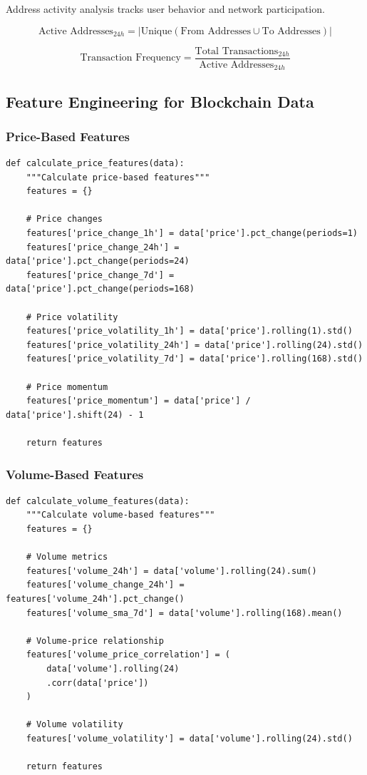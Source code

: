 \documentclass[12pt,a4paper]{article}
\begin{document}
Address activity analysis tracks user behavior and network participation.

\begin{equation}
\text{Active Addresses}_{24h} = |\text{Unique}(\text{From Addresses} \cup \text{To Addresses})|
\end{equation}

\begin{equation}
\text{Transaction Frequency} = \frac{\text{Total Transactions}_{24h}}{\text{Active Addresses}_{24h}}
\end{equation}

\subsection{Feature Engineering for Blockchain Data}

\subsubsection{Price-Based Features}

\begin{lstlisting}
def calculate_price_features(data):
    """Calculate price-based features"""
    features = {}
    
    # Price changes
    features['price_change_1h'] = data['price'].pct_change(periods=1)
    features['price_change_24h'] = data['price'].pct_change(periods=24)
    features['price_change_7d'] = data['price'].pct_change(periods=168)
    
    # Price volatility
    features['price_volatility_1h'] = data['price'].rolling(1).std()
    features['price_volatility_24h'] = data['price'].rolling(24).std()
    features['price_volatility_7d'] = data['price'].rolling(168).std()
    
    # Price momentum
    features['price_momentum'] = data['price'] / data['price'].shift(24) - 1
    
    return features
\end{lstlisting}

\subsubsection{Volume-Based Features}

\begin{lstlisting}
def calculate_volume_features(data):
    """Calculate volume-based features"""
    features = {}
    
    # Volume metrics
    features['volume_24h'] = data['volume'].rolling(24).sum()
    features['volume_change_24h'] = features['volume_24h'].pct_change()
    features['volume_sma_7d'] = data['volume'].rolling(168).mean()
    
    # Volume-price relationship
    features['volume_price_correlation'] = (
        data['volume'].rolling(24)
        .corr(data['price'])
    )
    
    # Volume volatility
    features['volume_volatility'] = data['volume'].rolling(24).std()
    
    return features
\end{lstlisting}
\end{document}
